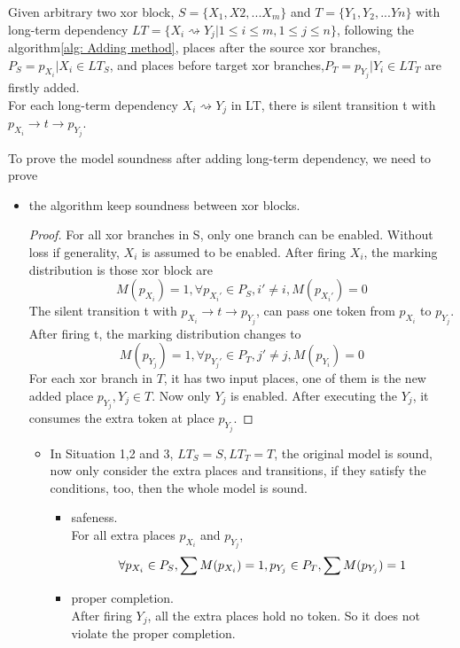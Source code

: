 Given arbitrary two xor block, $S=\{X_1,X2,...X_m\}$ and $T=\{Y_1,Y_2,...Yn\}$ with long-term dependency $LT=\{X_i \rightsquigarrow Y_j \vert 1 \leq i \leq m, 1 \leq j \leq n \}$, following the algorithm\ref{alg: Adding method}, places after the source xor branches,  $P_S={p_{X_i} \vert X_i \in LT_{S} }$, and places before target xor branches,$P_T={p_{Y_j} \vert Y_i \in LT_{T} }$ are firstly added. \\ 
For each long-term dependency $X_{i} \rightsquigarrow Y_{j}$ in LT, there is silent transition t with $p_{X_i} \rightarrow t \rightarrow p_{Y_{j}}$.

To prove the model soundness after adding long-term dependency, we need to prove 
\begin{itemize}
	\item the algorithm keep soundness between xor blocks.
	\begin{proof}
		For all xor branches in S, only one branch can be enabled. Without loss if generality, $X_i$ is assumed to be enabled. After firing $X_i$, the marking distribution is those xor block are  
		\[ M(p_{X_i}) = 1, 
		\forall p_{X_i\prime} \in P_S, i\prime \neq i, M(p_{X_i\prime})=0 \]
		The silent transition t with $p_{X_i} \rightarrow t \rightarrow p_{Y_{j}}$, can pass one token from $p_{X_i}$  to $p_{Y_j}$. 
		After firing t, the marking distribution changes to 
		\[ M(p_{Y_j}) = 1, 
		\forall p_{Y_j\prime} \in P_T, j\prime \neq j,  M(p_{Y_i})=0 \]
		For each xor branch in $T$, it has two input places, one of them is the new added place $p_{Y_j}, Y_j \in T$.	Now only $Y_j$ is enabled. After executing the $Y_j$, it consumes the extra token at place $p_{Y_j}$. 
	\end{proof}
	\begin{itemize}
		\item In Situation 1,2 and 3, $ LT_S = S, LT_T = T$, the original model is sound, now only consider the extra places and transitions, if they satisfy the conditions, too, then the whole model is sound. 
		\begin{itemize}
			\item safeness. \\
			For all extra places $p_{X_i}$ and $p_{Y_j}$, 
			\[\forall p_{X_i} \in P_S, \sum M(p_{X_i})=1, \\
		  	   p_{Y_j} \in P_T,  \sum M(p_{Y_j})=1 \] 
			\item proper completion.\\ %
			After firing $Y_j$, all the extra places hold no token. So it does not violate the proper completion.

\end{itemize}
\end{itemize}
\end{itemize}

